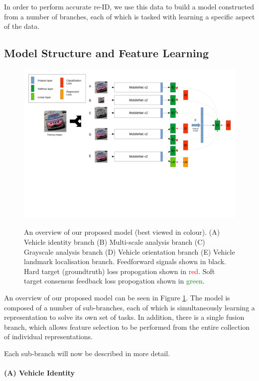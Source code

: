 \documentclass[10pt,twocolumn,letterpaper]{article}
\begin{document}
In order to perform accurate re-ID, we use this data to build a model constructed from a number of branches, each of which is tasked with learning a specific aspect of the data.

\subsection{Model Structure and Feature Learning}

\begin{figure}
  \includegraphics[width=\linewidth,trim=0cm 10cm 0cm 0cm,clip=true]{images/system_overview.pdf}
  \label{F:overview}
  \caption{An overview of our proposed model (best viewed in colour). (A) Vehicle identity branch (B) Multi-scale analysis branch (C) Grayscale analysis branch (D) Vehicle orientation branch (E) Vehicle landmark localisation branch. Feedforward signals shown in black. Hard target (groundtruth) loss propogation shown in \textcolor{red}{red}. Soft target consensus feedback loss propogation shown in \textcolor{green}{green}.}
\end{figure}

An overview of our proposed model can be seen in Figure \ref{F:overview}. The model is composed of a number of sub-branches, each of which is simultaneously learning a representation to solve its own set of tasks. In addition, there is a single fusion branch, which allows feature selection to be performed from the entire collection of individual representations.

Each sub-branch will now be described in more detail.

\paragraph{(A) Vehicle Identity}
\end{document}
